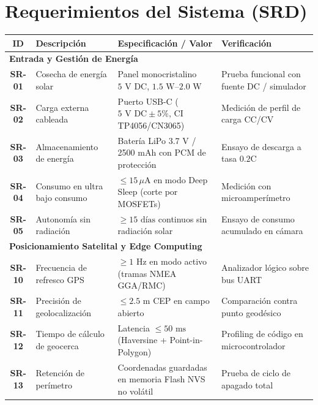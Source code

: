 \section*{Requerimientos del Sistema (SRD)}

\begin{table}[H]
    \centering
    \small
    \renewcommand{\arraystretch}{1.3}
    \begin{tabularx}{\linewidth}{|c|X|X|X|}
        \hline
        \rowcolor{gray!20}
        \textbf{ID} & \textbf{Descripción} & \textbf{Especificación / Valor} & \textbf{Verificación} \\ \hline

        \multicolumn{4}{|l|}{\cellcolor{gray!20}\textbf{Entrada y Gestión de Energía}} \\ \hline
        \textbf{SR-01} & Cosecha de energía solar & Panel monocristalino $5\text{ V DC}$, $1.5\text{ W} \text{--} 2.0\text{ W}$ & Prueba funcional con fuente DC / simulador \\ \hline
        \textbf{SR-02} & Carga externa cableada & Puerto USB-C ($5\text{ V DC} \pm 5\%$, CI TP4056/CN3065) & Medición de perfil de carga CC/CV \\ \hline
        \textbf{SR-03} & Almacenamiento de energía & Batería LiPo 3.7 V / 2500 mAh con PCM de protección & Ensayo de descarga a tasa $0.2\text{C}$ \\ \hline
        \textbf{SR-04} & Consumo en ultra bajo consumo & $\le 15\,\mu\text{A}$ en modo Deep Sleep (corte por MOSFETs) & Medición con microamperímetro \\ \hline
        \textbf{SR-05} & Autonomía sin radiación & $\ge 15\text{ días}$ continuos sin radiación solar & Ensayo de consumo acumulado en cámara \\ \hline

        \multicolumn{4}{|l|}{\cellcolor{gray!20}\textbf{Posicionamiento Satelital y Edge Computing}} \\ \hline
        \textbf{SR-10} & Frecuencia de refresco GPS & $\ge 1\text{ Hz}$ en modo activo (tramas NMEA GGA/RMC) & Analizador lógico sobre bus UART \\ \hline
        \textbf{SR-11} & Precisión de geolocalización & $\le 2.5\text{ m}$ CEP en campo abierto & Comparación contra punto geodésico \\ \hline
        \textbf{SR-12} & Tiempo de cálculo de geocerca & Latencia $\le 50\text{ ms}$ (Haversine + Point-in-Polygon) & Profiling de código en microcontrolador \\ \hline
        \textbf{SR-13} & Retención de perímetro & Coordenadas guardadas en memoria Flash NVS no volátil & Prueba de ciclo de apagado total \\ \hline


\end{tabularx}
\end{table}
